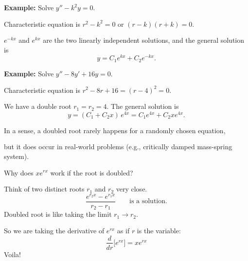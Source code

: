 \documentclass[10pt,aspectratio=169]{beamer}
\begin{document}
\begin{frame}

\textbf{Example:}
Solve
\quad $y'' - k^2 y = 0$.

\medskip
\pause

Characteristic equation is $r^2 - k^2 = 0$ or $(r-k)(r+k) = 0$.

\medskip
\pause

\wthus $e^{-k x}$ and $e^{kx}$ are the two
linearly independent solutions,
\pause
and the general solution is
\[
y = C_1 e^{kx} + C_2e^{-kx} .
\]

\medskip
\pause

\textbf{Example:}
Solve \quad
$y'' -8 y' + 16 y = 0$.

\medskip
\pause

Characteristic equation is $r^2 - 8 r + 16 = {(r-4)}^2 = 0$.

\medskip
\pause

We have
a double root $r_1 = r_2 = 4$.
\medskip
The general solution is
\[
y = (C_1 + C_2 x)\, e^{4 x} = C_1 e^{4x} + C_2 x e^{4x} .
\]
\end{frame}

\begin{frame}
In a sense, a doubled root rarely happens for a randomly chosen equation,

but it does occur in real-world problems
(e.g., critically damped mass-spring system).

\medskip
\pause

Why does $xe^{rx}$ work if the root is doubled?

\medskip
\pause

Think of two distinct roots $r_1$ and $r_2$ very close.
\pause
\[
\frac{e^{r_2 x} - e^{r_1 x}}{r_2 - r_1}
\qquad \text{is a solution.}
\]
\pause
Doubled root is like taking the limit
$r_1 \to r_2$.

\medskip
\pause

So we are taking the derivative of $e^{rx}$ as if $r$ is the variable:
\[
\frac{d}{dr} \bigl[ e^{rx} \bigr] = x e^{rx}
\]
\pause
Voila!

\end{frame}
\end{document}
